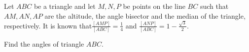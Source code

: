 Let $ABC$ be a triangle and let $M,N,P$ be points on the line $BC$ such that $AM,AN,AP$ are the altitude, the angle bisector and the median of the triangle, respectively. It is known that$\frac{[AMP]}{[ABC]}=\frac{1}{4}$ and $\frac{[ANP]}{[ABC]}=1-\frac{\sqrt{3}}{2}$.

Find the angles of triangle $ABC$.